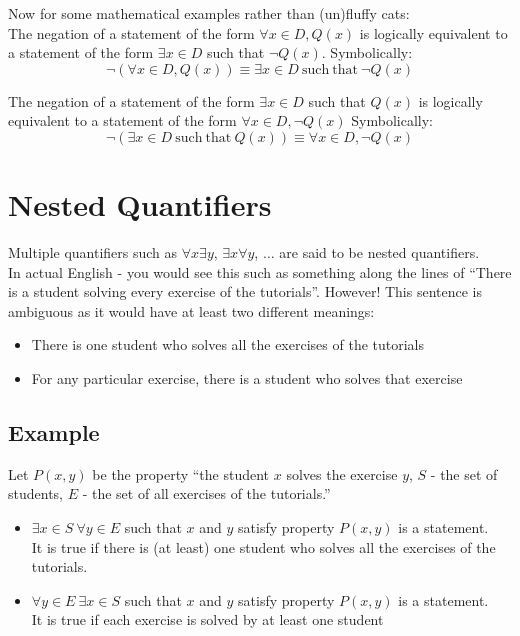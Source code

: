 Now for some mathematical examples rather than (un)fluffy cats:\\
The negation of a statement of the form $\forall x \in D, Q(x)$ is logically equivalent to a statement of the form $\exists x \in D$ such that $\neg Q(x)$. Symbolically:
\[ \neg(\forall x \in D, Q(x)) \equiv \exists x \in D \mathrm{\ such\ that\ } \neg Q(x) \]

The negation of a statement of the form $\exists x \in D$ such that $Q(x)$ is logically equivalent to a statement of the form $\forall x \in D, \neg Q(x)$ Symbolically:
\[ \neg(\exists x \in D \mathrm{\ such\ that\ } Q(x)) \equiv \forall x \in D, \neg Q(x) \]

\section{Nested Quantifiers}
Multiple quantifiers such as $\forall x \exists y$, $\exists x \forall y$, $\ldots$ are said to be nested quantifiers.\\

In actual English - you would see this such as something along the lines of ``There is a student solving every exercise of the tutorials''. However! This sentence is ambiguous as it would have at least two different meanings:
\begin{itemize}
    \item There is one student who solves all the exercises of the tutorials
    \item For any particular exercise, there is a student who solves that exercise
\end{itemize}

\subsection{Example}
Let $P(x,y)$ be the property ``the student $x$ solves the exercise $y$, $S$ - the set of students, $E$ - the set of all exercises of the tutorials.''
\begin{itemize}
    \item $\exists x \in S\ \forall y \in E$ such that $x$ and $y$ satisfy property $P(x,y)$ is a statement.\\
    It is true if there is (at least) one student who solves all the exercises of the tutorials.
    \item $\forall y \in E\ \exists x \in S$ such that $x$ and $y$ satisfy property $P(x,y)$ is a statement.\\
    It is true if each exercise is solved by at least one student
\end{itemize}